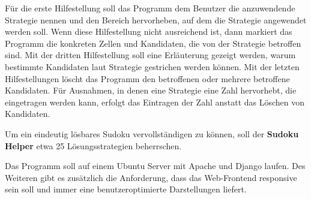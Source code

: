Für die erste Hilfestellung soll das Programm dem Benutzer die anzuwendende Strategie nennen und den Bereich hervorheben, auf dem die Strategie angewendet werden soll. Wenn diese Hilfestellung nicht ausreichend ist, dann markiert das Programm die konkreten Zellen und Kandidaten, die von der Strategie betroffen sind. Mit der dritten Hilfestellung soll eine Erläuterung gezeigt werden, warum bestimmte Kandidaten laut Strategie gestrichen werden können. Mit der letzten Hilfestellungen löscht das Programm den betroffenen oder mehrere betroffene Kandidaten. Für Ausnahmen, in denen eine Strategie eine Zahl hervorhebt, die eingetragen werden kann, erfolgt das Eintragen der Zahl anstatt das Löschen von Kandidaten.

Um ein eindeutig lösbares Sudoku vervollständigen zu können, soll der \textbf{Sudoku Helper} etwa 25 Lösungsstrategien beherrschen.

Das Programm soll auf einem Ubuntu Server mit Apache und Django laufen. Des Weiteren gibt es zusätzlich die Anforderung, dass das Web-Frontend responsive sein soll und immer eine benutzeroptimierte Darstellungen liefert.
